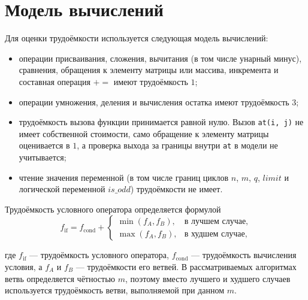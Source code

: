 \documentclass{bmstu}
\begin{document}
\section{Модель вычислений}
Для оценки трудоёмкости используется следующая модель вычислений:
\begin{itemize}
	\item операции присваивания, сложения, вычитания (в том числе унарный
	      минус), сравнения, обращения к элементу матрицы или массива,
	      инкремента и составная операция $\mathrel{+=}$ имеют трудоёмкость $1$;
	\item операции умножения, деления и вычисления остатка имеют
	      трудоёмкость $3$;
	\item трудоёмкость вызова функции принимается равной нулю. Вызов
	      \texttt{at(i, j)} не имеет собственной стоимости, само обращение
	      к элементу матрицы оценивается в $1$, а проверка выхода за границы
	      внутри \texttt{at} в модели не учитывается;
	\item чтение значения переменной (в том числе границ циклов $n$, $m$,
	      $q$, $\mathit{limit}$ и логической переменной $\mathit{is\_odd}$)
	      трудоёмкости не имеет.
\end{itemize}

Трудоёмкость условного оператора определяется формулой
\begin{equation}
	f_{\mathrm{if}} = f_{\mathrm{cond}} +
	\begin{cases}
		\min(f_A, f_B), & \text{в лучшем случае}, \\
		\max(f_A, f_B), & \text{в худшем случае},
	\end{cases}
\end{equation}

где $f_{\mathrm{if}}$ --- трудоёмкость условного оператора,
$f_{\mathrm{cond}}$ --- трудоёмкость вычисления условия, а
$f_A$ и $f_B$ --- трудоёмкости его ветвей. В рассматриваемых алгоритмах
ветвь определяется чётностью $m$, поэтому вместо лучшего и худшего случаев
используется трудоёмкость ветви, выполняемой при данном $m$.
\end{document}
